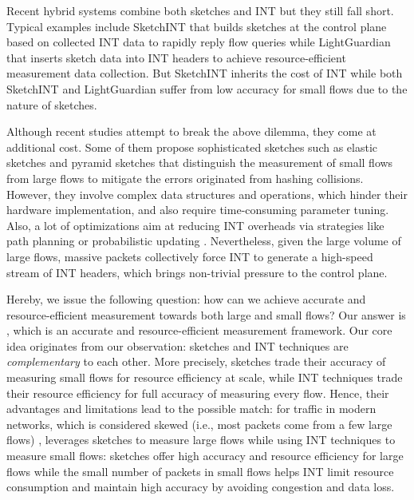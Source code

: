 Recent hybrid systems combine both sketches and INT \cite{yang2023sketchint,zhao2021lightguardian} but they still fall short. Typical examples include SketchINT \cite{yang2023sketchint} that builds sketches at the control plane based on collected INT data to rapidly reply flow queries while LightGuardian \cite{zhao2021lightguardian} that inserts sketch data into INT headers to achieve resource-efficient measurement data collection. But SketchINT inherits the cost of INT while both SketchINT and LightGuardian suffer from low accuracy for small flows due to the nature of sketches. 


Although recent studies attempt to break the above dilemma, they come at additional cost. Some of them propose sophisticated sketches such as elastic sketches \cite{yang2018elastic} and pyramid sketches \cite{yang2017pyramid} that distinguish the measurement of small flows from large flows to mitigate the errors originated from hashing collisions. However, they involve complex data structures and operations, which hinder their hardware implementation, and also require time-consuming parameter tuning. Also, a lot of optimizations aim at reducing INT overheads via strategies like path planning \cite{pan2019int} or probabilistic updating \cite{ben2020pint}. Nevertheless, given the large volume of large flows, massive packets collectively force INT to generate a high-speed stream of INT headers, which brings non-trivial pressure to the control plane. 

Hereby, we issue the following question: how can we achieve accurate and resource-efficient measurement towards both large and small flows? Our answer is \sysname, which is an accurate and resource-efficient measurement framework. Our core idea originates from our observation: sketches and INT techniques are \emph{complementary} to each other. More precisely, sketches trade their accuracy of measuring small flows for resource efficiency at scale, while INT techniques trade their resource efficiency for full accuracy of measuring every flow. Hence, their advantages and limitations lead to the possible match: for traffic in modern networks, which is considered skewed (i.e., most packets come from a few large flows) \cite{roy2015inside,huang2021toward,caida,benson2010network,yang2018elastic}, \sysname leverages sketches to measure large flows while using INT techniques to measure small flows: sketches offer high accuracy and resource efficiency for large flows while the small number of packets in small flows helps INT limit resource consumption and maintain high accuracy by avoiding congestion and data loss. 

